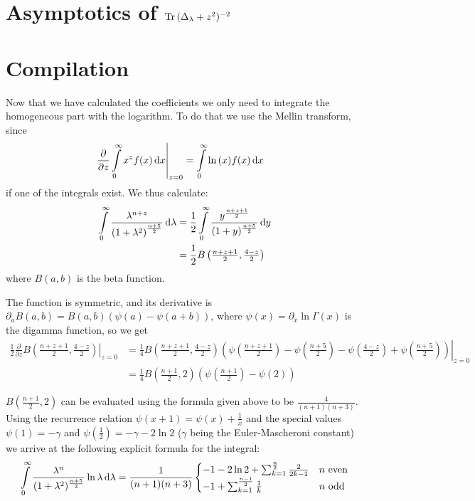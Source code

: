\section{Asymptotics of $\Tr{(\Delta_\lambda + z^2)^{-2}}$}

\section{Compilation}
Now that we have calculated the coefficients we only need to integrate the
homogeneous part with the logarithm. To do that we use the Mellin transform,
since
\begin{align*}
    \left.\frac\partial{\partial z} \Integ[\infty]{0}{x}{x^z f(x)}\right|_{z=0}
    &= \Integ[\infty]{0}{x}{\ln{(x)} f(x)}
\end{align*}
if one of the integrals exist. We thus calculate:
\begin{align*}
    \Integ[\infty]{0}{\lambda}{\frac{\lambda^{n + z}}{\left(1 +
    \lambda^2\right)^{\frac{n+5}{2}}}} &=
    \frac12\Integ[\infty]{0}{y}{\frac{y^{\frac{n+z+1}{2}}}{(1 +
    y)^{\frac{n+5}{2}}}} \\
    &= \frac12 B\left(\tfrac{n+z+1}{2}, \tfrac{4-z}{2}\right)
\end{align*}
where $B(a,b)$ is the beta function. %

The function is symmetric, and its
derivative is $\partial_a B(a,b) = B(a,b) (\psi(a) - \psi(a+b))$, where
$\psi(x) = \partial_x \ln\Gamma(x)$ is the digamma function, so we get
\begin{align*}
    \left.\frac12\frac\partial{\partial z} B\left(\tfrac{n+z+1}{2}, \tfrac{4-z}{2}\right)\right|_{z=0}
    &= \left.\frac14 B\left(\tfrac{n+z+1}{2}, \tfrac{4-z}{2}\right)
    \left(\psi\left(\tfrac{n+z+1}{2}\right) - \psi\left(\tfrac{n+5}{2}\right) -
    \psi\left(\tfrac{4-z}{2}\right) +
    \psi\left(\tfrac{n+5}{2}\right)\right)\right|_{z=0} \\
    &= \frac14 B\left(\tfrac{n+1}{2}, 2\right)
    \left(\psi\left(\tfrac{n+1}{2}\right) - \psi\left(2\right)\right)
\end{align*}

$B(\tfrac{n+1}{2}, 2)$ can be evaluated using the formula given above to be
$\tfrac{4}{(n+1)(n+3)}$. Using the recurrence relation $\psi(x + 1) = \psi(x) +
\frac{1}{x}$ and the special values $\psi(1) = -\gamma$ and $\psi(\tfrac{1}{2})
= -\gamma - 2\ln 2$ ($\gamma$ being the Euler-Mascheroni constant) we arrive at
the following explicit formula for the integral:
\begin{align*}
    \Integ[\infty]{0}{\lambda}{\frac{\lambda^n}{(1 +
    \lambda^2)^{\frac{n+5}{2}}}\ln{\lambda}} = \frac{1}{(n+1)(n+3)}
        \begin{cases} 
            -1 - 2\ln 2 + \sum_{k=1}^{\frac n 2}\frac{2}{2k - 1} & n\text{
            even} \\
            -1 + \sum_{k=1}^{\frac{n-1}{2}}\frac 1 k & n\text{ odd}
        \end{cases}
\end{align*}
